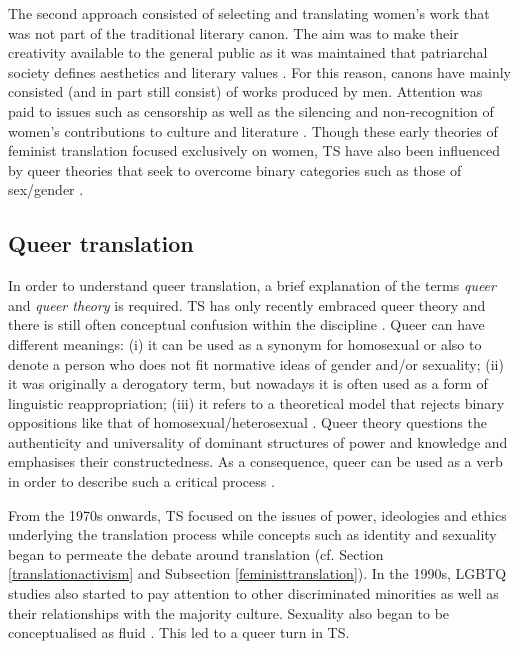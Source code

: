 The second approach consisted of selecting and translating women's work that was not part of the traditional literary canon. The aim was to make their creativity available to the general public as it was maintained that patriarchal society defines aesthetics and literary values \citep[30]{von2016translation}. For this reason, canons have mainly consisted (and in part still consist) of works produced by men. Attention was paid to issues such as censorship as well as the silencing and non-recognition of women's contributions to culture and literature \citep[2]{von2011preface}. Though these early theories of feminist translation focused exclusively on women, TS have also been influenced by queer theories that seek to overcome binary categories such as those of sex/gender \citep[3]{von2011preface}. 


\subsection{Queer translation}

In order to understand queer translation, a brief explanation of the terms \textit{queer} and \textit{queer theory} is required. TS has only recently embraced queer theory and there is still often conceptual confusion within the discipline \citep[1]{baer2017introduction}. Queer can have different meanings: (i) it can be used as a synonym for homosexual or also to denote a person who does not fit normative ideas of gender and/or sexuality; (ii) it was originally a derogatory term, but nowadays it is often used as a form of linguistic reappropriation; (iii) it refers to a theoretical model that rejects binary oppositions like that of homosexual/heterosexual \citep[2]{baer2017introduction}. Queer theory questions the authenticity and universality of dominant structures of power and knowledge and emphasises their constructedness. As a consequence, queer can be used as a verb in order to describe such a critical process \citep[3]{baer2017introduction}.

From the 1970s onwards, TS focused on the issues of power, ideologies and ethics underlying the translation process while concepts such as identity and sexuality began to permeate the debate around translation (cf. Section \ref{translationactivism} and Subsection \ref{feministtranslation}). In the 1990s, LGBTQ studies also started to pay attention to other discriminated minorities as well as their relationships with the majority culture. Sexuality also began to be conceptualised as fluid \citep[2f]{amenta2020tradurre}. This led to a queer turn in TS.

